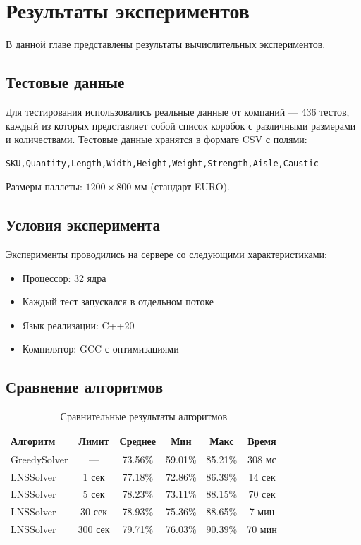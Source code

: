\chapter{Результаты экспериментов}
\label{cha:Results}

В данной главе представлены результаты вычислительных экспериментов.

\section{Тестовые данные}

Для тестирования использовались реальные данные от компаний — 436 тестов, каждый из которых представляет собой список коробок с различными размерами и количествами. Тестовые данные хранятся в формате CSV с полями:

\begin{verbatim}
SKU,Quantity,Length,Width,Height,Weight,Strength,Aisle,Caustic
\end{verbatim}

Размеры паллеты: $1200 \times 800$ мм (стандарт EURO).

\section{Условия эксперимента}

Эксперименты проводились на сервере со следующими характеристиками:
\begin{itemize}
    \item Процессор: 32 ядра
    \item Каждый тест запускался в отдельном потоке
    \item Язык реализации: C++20
    \item Компилятор: GCC с оптимизациями
\end{itemize}

\section{Сравнение алгоритмов}

\begin{table}[ht]
\centering
\caption{Сравнительные результаты алгоритмов}
\label{tab:benchmark}
\begin{tabular}{|l|c|c|c|c|c|}
\hline
\textbf{Алгоритм} & \textbf{Лимит} & \textbf{Среднее} & \textbf{Мин} & \textbf{Макс} & \textbf{Время} \\
\hline
GreedySolver & — & 73.56\% & 59.01\% & 85.21\% & 308 мс \\
LNSSolver & 1 сек & 77.18\% & 72.86\% & 86.39\% & 14 сек \\
LNSSolver & 5 сек & 78.23\% & 73.11\% & 88.15\% & 70 сек \\
LNSSolver & 30 сек & 78.93\% & 75.36\% & 88.65\% & 7 мин \\
LNSSolver & 300 сек & 79.71\% & 76.03\% & 90.39\% & 70 мин \\
\hline
\end{tabular}
\end{table}

